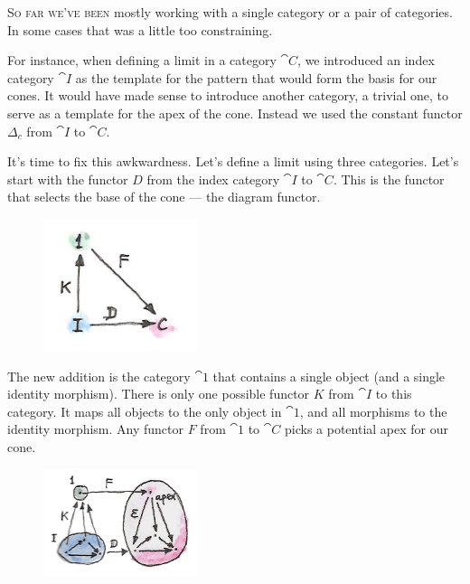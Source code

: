 
\lettrine[lhang=0.17]{S}{o far we've been} mostly working with a single category or a pair of
categories. In some cases that was a little too constraining.

For instance, when defining a limit in a category $\cat{C}$, we introduced an
index category $\cat{I}$ as the template for the pattern that would
form the basis for our cones. It would have made sense to introduce
another category, a trivial one, to serve as a template for the apex of
the cone. Instead we used the constant functor $\Delta_c$ from
$\cat{I}$ to $\cat{C}$.

It's time to fix this awkwardness. Let's define a limit using three
categories. Let's start with the functor $D$ from the index
category $\cat{I}$ to $\cat{C}$. This is the functor that selects the base
of the cone --- the diagram functor.

\begin{figure}[H]
\centering
\includegraphics[width=0.4\textwidth]{images/kan2.jpg}
\end{figure}

\noindent
The new addition is the category $\cat{1}$ that contains a single
object (and a single identity morphism). There is only one possible
functor $K$ from $\cat{I}$ to this category. It maps all objects
to the only object in $\cat{1}$, and all morphisms to the identity
morphism. Any functor $F$ from $\cat{1}$ to $\cat{C}$ picks a
potential apex for our cone.

\begin{figure}[H]
\centering
\includegraphics[width=0.4\textwidth]{images/kan15.jpg}
\end{figure}

